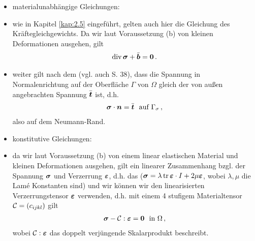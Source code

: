 \begin{itemize}
\item materialunabhängige Gleichungen:

\item wie in Kapitel \ref{kap:2.5} eingeführt, gelten auch hier die Gleichung des Kräftegleichgewichts. Da wir laut Voraussetzung (b) von kleinen Deformationen ausgehen, gilt
\begin{align}\label{eq:3.38}
	\operatorname{div}\boldsymbol \sigma + \bar{\boldsymbol b} = \boldsymbol 0 \, .
\end{align}

\item weiter gilt nach dem \textit{} (vgl. auch \cite{WriggersContact} S. 38), dass die Spannung in Normalenrichtung auf der Oberfläche $\Gamma$ von $\Omega$ gleich der von außen angebrachten Spannung $\bar{\boldsymbol t}$ ist, d.h.
\begin{align}\label{eq:3.39}
	\boldsymbol \sigma \cdot \boldsymbol n = \bar{\boldsymbol t} \ \text{ auf } \Gamma_\sigma \, ,
\end{align}
also auf dem Neumann-Rand.

\item konstitutive Gleichungen:

\item da wir laut Voraussetzung (b) von einem linear elastischen Material und kleinen Deformationen ausgehen, gilt ein linearer Zusammenhang bzgl. der Spannung $\boldsymbol \sigma$ und Verzerrung $\boldsymbol {\varepsilon}$, d.h. das  ($\boldsymbol \sigma = \lambda \operatorname{tr} \boldsymbol {\varepsilon} \cdot  I + 2 \mu \boldsymbol {\varepsilon}$, wobei $\lambda, \mu$ die Lamé Konstanten sind) und wir können wir den linearisierten Verzerrungstensor $\boldsymbol {\varepsilon}$ verwenden, d.h. mit einem 4 stufigem Materialtensor $\mathcal C = (c_{ijkl})$ gilt
\begin{align}\label{eq:3.40}
	\boldsymbol \sigma - \mathcal C : \boldsymbol {\varepsilon} = \boldsymbol 0 \ \text{ in } \Omega \, ,
\end{align}
wobei $\mathcal C : \boldsymbol {\varepsilon}$ das doppelt verjüngende Skalarprodukt beschreibt.




\end{itemize}

